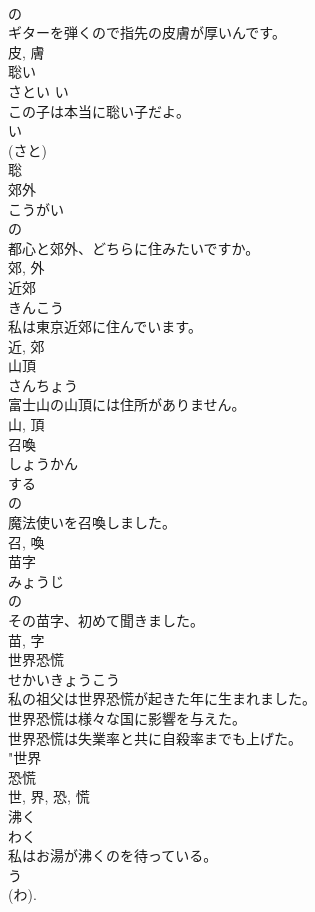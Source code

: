 \documentclass[8pt]{extreport}
\begin{document}
\begin{CJK}{UTF8}{min}
\\	の 
\\	ギターを弾くので指先の皮膚が厚いんです。	
\\	皮, 膚	
\\	聡い	
\\	さとい	い 
\\	この子は本当に聡い子だよ。	
\\	い 
\\	(さと) 
\\	聡	
\\	郊外	
\\	こうがい	
\\	の 
\\	都心と郊外、どちらに住みたいですか。	
\\	郊, 外	
\\	近郊	
\\	きんこう	
\\	私は東京近郊に住んでいます。	
\\	近, 郊	
\\	山頂	
\\	さんちょう	
\\	富士山の山頂には住所がありません。	
\\	山, 頂	
\\	召喚	
\\	しょうかん	
\\	する 
\\	の 
\\	魔法使いを召喚しました。	
\\	召, 喚	
\\	苗字	
\\	みょうじ	
\\	の 
\\	その苗字、初めて聞きました。	
\\	苗, 字	
\\	世界恐慌	
\\	せかいきょうこう	
\\	私の祖父は世界恐慌が起きた年に生まれました。	
\\	世界恐慌は様々な国に影響を与えた。	
\\	世界恐慌は失業率と共に自殺率までも上げた。	
\\	"世界 
\\	恐慌 
\\	世, 界, 恐, 慌	
\\	沸く	
\\	わく	
\\	私はお湯が沸くのを待っている。	
\\	う 
\\	(わ). 

\end{CJK}
\end{document}
